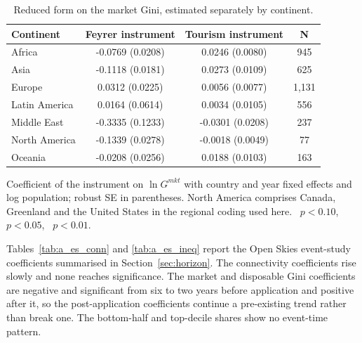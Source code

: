 \begin{table}[H]\centering\caption{Reduced form on the market Gini, estimated separately by continent.}\label{tab:a_rfcont}
\begin{threeparttable}\small\begin{tabular}{lccc}
\toprule
Continent & Feyrer instrument & Tourism instrument & N \\
\midrule
Africa & -0.0769\sym{***} (0.0208) & 0.0246\sym{***} (0.0080) & 945 \\
Asia & -0.1118\sym{***} (0.0181) & 0.0273\sym{**} (0.0109) & 625 \\
Europe & 0.0312 (0.0225) & 0.0056 (0.0077) & 1,131 \\
Latin America & 0.0164 (0.0614) & 0.0034 (0.0105) & 556 \\
Middle East & -0.3335\sym{***} (0.1233) & -0.0301 (0.0208) & 237 \\
North America & -0.1339\sym{***} (0.0278) & -0.0018 (0.0049) & 77 \\
Oceania & -0.0208 (0.0256) & 0.0188\sym{*} (0.0103) & 163 \\
\bottomrule
\end{tabular}
\begin{tablenotes}\footnotesize\item Coefficient of the instrument on $\ln G^{mkt}$ with country and year fixed effects and log population; robust SE in parentheses. North America comprises Canada, Greenland and the United States in the regional coding used here. \sym{*}~$p<0.10$, \sym{**}~$p<0.05$, \sym{***}~$p<0.01$.\end{tablenotes}\end{threeparttable}\end{table}

Tables~\ref{tab:a_es_conn} and \ref{tab:a_es_ineq} report the Open Skies event-study coefficients summarised in Section~\ref{sec:horizon}. The connectivity coefficients rise slowly and none reaches significance. The market and disposable Gini coefficients are negative and significant from six to two years before application and positive after it, so the post-application coefficients continue a pre-existing trend rather than break one. The bottom-half and top-decile shares show no event-time pattern.

